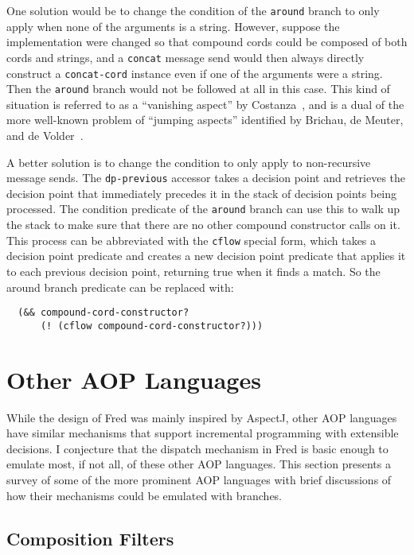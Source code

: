 \documentclass{acm_proc_article-sp}
\newcommand{\code}[1]{\texttt{#1}}
\begin{document}
One solution would be to change the condition of the \code{around}
branch to only apply when none of the arguments is a string.  However,
suppose the implementation were changed so that compound cords could
be composed of both cords and strings, and a \code{concat} message
send would then always directly construct a \code{concat-cord}
instance even if one of the arguments were a string.  Then the
\code{around} branch would not be followed at all in this case.  This
kind of situation is referred to as a ``vanishing aspect'' by
Costanza~\cite{vanishing}, and is a dual of the more well-known
problem of ``jumping aspects'' identified by Brichau, de Meuter, and
de Volder~\cite{jumping}.

A better solution is to change the condition to only apply to
non-recursive message sends.  The \code{dp-previous} accessor
takes a decision point and retrieves the decision point that
immediately precedes it in the stack of decision points being
processed.  The condition predicate of the \code{around} branch can
use this to walk up the stack to make sure that there are no
other compound constructor calls on it.  This process can be
abbreviated with the \code{cflow} special form, which takes a
decision point predicate and creates a new decision point predicate
that applies it to each previous decision point, returning true when
it finds a match.  So the around branch predicate can be replaced with:

\begin{verbatim}
  (&& compound-cord-constructor?
      (! (cflow compound-cord-constructor?)))
\end{verbatim}

\section{Other AOP Languages}
\label{section:other-langs}

While the design of Fred was mainly inspired by AspectJ, other AOP
languages have similar mechanisms that support incremental programming
with extensible decisions.  I conjecture that the dispatch mechanism
in Fred is basic enough to emulate most, if not all, of these other
AOP languages.  This section presents a survey of some of the more
prominent AOP languages with brief discussions of how their mechanisms
could be emulated with branches.

\subsection{Composition Filters}
\end{document}
